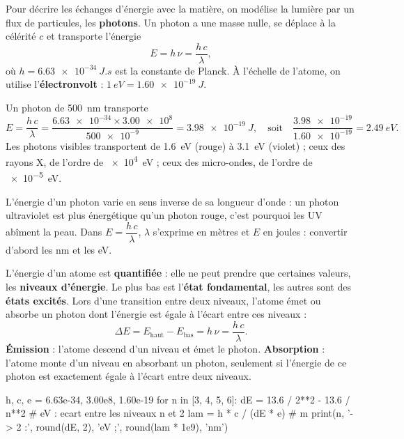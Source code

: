 \begin{definition}
Pour décrire les échanges d'énergie avec la matière, on modélise la lumière par un flux de particules, les \textbf{photons}. Un photon a
une masse nulle, se déplace à la célérité $c$ et transporte l'énergie
\[E=h\,\nu=\frac{h\,c}{\lambda},\]
où $h=\qty{6,63e-34}{J.s}$ est la constante de Planck. À l'échelle de l'atome, on utilise l'\textbf{électronvolt} : $\qty{1}{eV}=\qty{1,60e-19}{J}$.
\end{definition}
\begin{propriete}
Un photon de \qty{500}{nm} transporte
\[E=\frac{h\,c}{\lambda}=\frac{\num{6,63e-34}\times\num{3,00e8}}{\num{500e-9}}=\qty{3,98e-19}{J},\quad\text{soit}\quad\frac{\num{3,98e-19}}{\num{1,60e-19}}=\qty{2,49}{eV}.\]
Les photons visibles transportent de \qty{1,6}{eV} (rouge) à \qty{3,1}{eV} (violet) ; ceux des rayons X, de l'ordre de \qty{e4}{eV} ; ceux des
micro-ondes, de l'ordre de \qty{e-5}{eV}.
\end{propriete}
\begin{attention}
L'énergie d'un photon varie en sens inverse de sa longueur d'onde : un photon ultraviolet est plus énergétique qu'un photon rouge,
c'est pourquoi les UV abîment la peau. Dans $E=\dfrac{h\,c}{\lambda}$, $\lambda$ s'exprime en mètres et $E$ en joules : convertir d'abord les nm et les eV.
\end{attention}
\begin{loi}
L'énergie d'un atome est \textbf{quantifiée} : elle ne peut prendre que certaines valeurs, les \textbf{niveaux d'énergie}. Le plus bas est
l'\textbf{état fondamental}, les autres sont des \textbf{états excités}. Lors d'une transition entre deux niveaux, l'atome émet ou absorbe un
photon dont l'énergie est égale à l'écart entre ces niveaux :
\[\Delta E=E_\text{haut}-E_\text{bas}=h\,\nu=\frac{h\,c}{\lambda}.\]
\textbf{Émission} : l'atome descend d'un niveau et émet le photon. \textbf{Absorption} : l'atome monte d'un niveau en absorbant un photon,
seulement si l'énergie de ce photon est exactement égale à l'écart entre deux niveaux.
\end{loi}
\par{}
\begin{python}
h, c, e = 6.63e-34, 3.00e8, 1.60e-19
for n in [3, 4, 5, 6]:
    dE = 13.6 / 2**2 - 13.6 / n**2       # eV : ecart entre les niveaux n et 2
    lam = h * c / (dE * e)                # m
    print(n, '-> 2 :', round(dE, 2), 'eV ;', round(lam * 1e9), 'nm')
\end{python}
